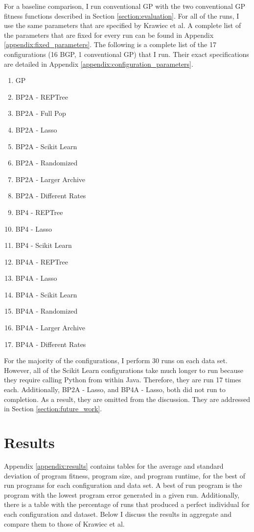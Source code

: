For a baseline comparison, I run conventional GP with the two conventional GP fitness functions described in Section \ref{section:evaluation}.  For all of the runs, I use the same parameters that are specified by Krawiec et al.  A complete list of the parameters that are fixed for every run can be found in Appendix \ref{appendix:fixed_parameters}.  The following is a complete list of the 17 configurations (16 BGP, 1 conventional GP) that I run.  Their exact specifications are detailed in Appendix \ref{appendix:configuration_parameters}.

\begin{multicols}{2}
\begin{enumerate}
\item GP
\item BP2A - REPTree
\item BP2A - Full Pop
\item BP2A - Lasso
\item BP2A - Scikit Learn
\item BP2A - Randomized
\item BP2A - Larger Archive
\item BP2A - Different Rates
\item BP4 - REPTree
\item BP4 - Lasso
\item BP4 - Scikit Learn
\item BP4A - REPTree
\item BP4A - Lasso
\item BP4A - Scikit Learn
\item BP4A - Randomized
\item BP4A - Larger Archive
\item BP4A - Different Rates
\end{enumerate}
\end{multicols}

For the majority of the configurations, I perform 30 runs on each data set.  However, all of the Scikit Learn configurations take much longer to run because they require calling Python from within Java.  Therefore, they are run 17 times each.  Additionally, BP2A - Lasso, and BP4A - Lasso, both did not run to completion.  As a result, they are omitted from the discussion.  They are addressed in Section \ref{section:future_work}.

\section{Results}
Appendix \ref{appendix:results} contains tables for the average and standard deviation of program fitness, program size, and program runtime, for the best of run programs for each configuration and data set.  A best of run program is the program with the lowest program error generated in a given run.  Additionally, there is a table with the percentage of runs that produced a perfect individual for each configuration and dataset.  Below I discuss the results in aggregate and compare them to those of Krawiec et al.

